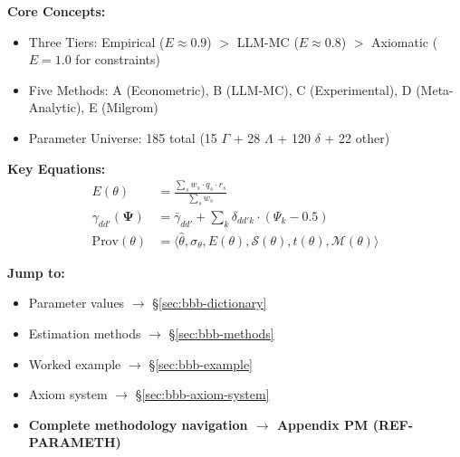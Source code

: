 \documentclass[11pt,a4paper]{article}
\theoremstyle{definition}
\begin{document}
\begin{tcolorbox}[colback=green!5!white, colframe=green!75!black, 
    title=\textbf{Quick Reference}]

\textbf{Core Concepts:}
\begin{itemize}[nosep]
    \item Three Tiers: Empirical ($E \approx 0.9$) $>$ LLM-MC ($E \approx 0.8$) $>$ Axiomatic ($E = 1.0$ for constraints)
    \item Five Methods: A (Econometric), B (LLM-MC), C (Experimental), D (Meta-Analytic), E (Milgrom)
    \item Parameter Universe: 185 total (15 $\Gamma$ + 28 $\Lambda$ + 120 $\delta$ + 22 other)
\end{itemize}

\textbf{Key Equations:}
\begin{align}
E(\theta) &= \frac{\sum_{s} w_s \cdot q_s \cdot r_s}{\sum_{s} w_s} \tag{Epistemic Status} \\
\gamma_{dd'}(\boldsymbol{\Psi}) &= \bar{\gamma}_{dd'} + \sum_{k} \delta_{dd'k} \cdot (\Psi_k - 0.5) \tag{Context Modulation} \\
\text{Prov}(\theta) &= \langle \hat{\theta}, \sigma_\theta, E(\theta), \mathcal{S}(\theta), t(\theta), \mathcal{M}(\theta) \rangle \tag{Provenance Tuple}
\end{align}

\textbf{Jump to:}
\begin{itemize}[nosep]
    \item Parameter values $\rightarrow$ \S\ref{sec:bbb-dictionary}
    \item Estimation methods $\rightarrow$ \S\ref{sec:bbb-methods}
    \item Worked example $\rightarrow$ \S\ref{sec:bbb-example}
    \item Axiom system $\rightarrow$ \S\ref{sec:bbb-axiom-system}
    \item \textbf{Complete methodology navigation $\rightarrow$ Appendix PM (REF-PARAMETH)}
\end{itemize}

\end{tcolorbox}




\end{document}
